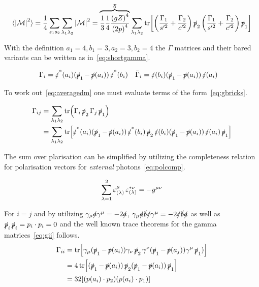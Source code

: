 \begin{equation}
  \label{eq:averagedm}
  \langle\abs{\mathcal{M}}^2\rangle = \frac{1}{4}\sum_{s_1 s_2}\sum_{\lambda_1
    \lambda_2} \abs{\mathcal{M}}^2=\overbrace{\frac{1}{3}\frac{1}{4}\frac{\qty(gZ)^4}{\qty(2p)^4}}^\mathfrak{F}\sum_{\lambda_1
    \lambda_2}\tr[\qty(\frac{\Gamma_1}{s'^2}+\frac{\Gamma_2}{c'^2})
  \ps_2\qty(\frac{\bar{\Gamma}_1}{s'^2}+\frac{\bar{\Gamma}_2}{c'^2})\ps_1]
\end{equation}

With the definition \(a_1=4,b_1=3,a_2=3,b_2=4\) the \(\Gamma\)
matrices and their bared variants can be written as in~\eqref{eq:shortgamma}.

\begin{align}
  \label{eq:shortgamma}
  \Gamma_i &= \pses(a_i)(\ps_1 - \ps(a_i))\pses(b_i) & \bar{\Gamma}_i &= \pes(b_i)(\ps_1 - \ps(a_i))\pes(a_i)
\end{align}

To work out~\eqref{eq:averagedm} one must evaluate terms of the
form~\eqref{eq:gbricks}.

\begin{equation}
  \label{eq:gbricks}
  \begin{split}
    \Gamma_{ij} &= \sum_{\lambda_1\lambda_2}
    \tr(\Gamma_i\ps_2\Gamma_j\ps_1)\\
    &= \sum_{\lambda_1\lambda_2}
    \tr[\pses(a_i)(\ps_1-\ps(a_i))\pses(b_i)\ps_2\pes(b_i)(\ps_1 -
    \ps(a_i))\pes(a_i)\ps_1]
  \end{split}
\end{equation}

The sum over plarisation can be simplified by utilizing the
completeness relation for polarisation vectors for \emph{external}
photons~\eqref{eq:polcomp}.

\begin{equation}
  \label{eq:polcomp}
  \sum_{\lambda=1}^{2}\pe_{(\lambda)}^\mu\pe_{(\lambda)}^{*\nu} = -g^{\mu\nu}
\end{equation}

For \(i=j\) and by utilizing \(\gamma_\mu\sl{a}\gamma^\mu=-2\sl{a}\),
 \(\gamma_\mu\sl{a}\sl{b}\sl{c}\gamma^\mu=-2\sl{c}\sl{b}\sl{a}\) as
well as \(\ps_i\ps_i=p_i\cdot p_i = 0\) and the well known trace
theorems for the gamma matrices~\eqref{eq:gii} follows.
\begin{equation}
  \label{eq:gii}
  \begin{split}
\Gamma_{ii} &=
\tr[\gamma_\mu(\ps_1-\ps(a_i))\gamma_\nu\ps_2\gamma^\nu(\ps_1-\ps(a_j))\gamma^\mu\ps_1)]
\\
&= 4\tr[(\ps_1-\ps(a_i))\ps_2(\ps_1-\ps(a_i))\ps_1]\\
&= 32\qty[(p(a_i)\cdot p_2)(p(a_i)\cdot p_1)]
\end{split}
\end{equation}


